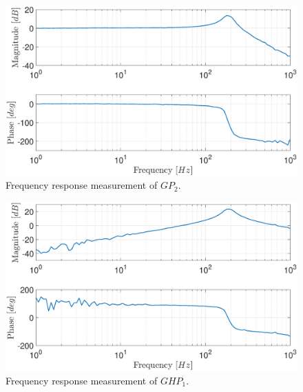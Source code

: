 \documentclass[a4paper, 10pt, conference]{ieeeconf}
\begin{document}
\begin{figure}
\centering
\includegraphics[width=\columnwidth]{../pics/G.eps}
\caption{Frequency response measurement of $GP_2$.}
\label{fig:G}
\end{figure} 

\begin{figure}
\centering
\includegraphics[width=\columnwidth]{../pics/GHP1.eps}
\caption{Frequency response measurement of $GHP_1$.}
\label{fig:GHP1}
\end{figure} 
\end{document}
